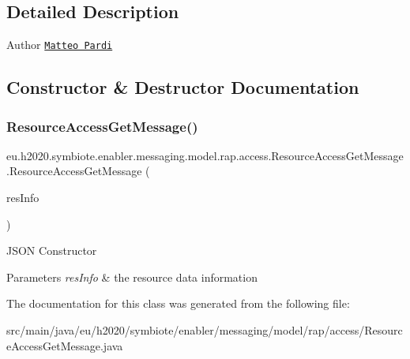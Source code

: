 \subsection{Detailed Description}
\begin{DoxyAuthor}{Author}
\href{mailto:m.pardi@nextworks.it}{\tt Matteo Pardi} 
\end{DoxyAuthor}


\subsection{Constructor \& Destructor Documentation}
\mbox{\label{classeu_1_1h2020_1_1symbiote_1_1enabler_1_1messaging_1_1model_1_1rap_1_1access_1_1ResourceAccessGetMessage_a539d5238081dabe82785d5323e6fb70e}} 
\subsubsection{\texorpdfstring{Resource\+Access\+Get\+Message()}{ResourceAccessGetMessage()}}
{\footnotesize\ttfamily eu.\+h2020.\+symbiote.\+enabler.\+messaging.\+model.\+rap.\+access.\+Resource\+Access\+Get\+Message.\+Resource\+Access\+Get\+Message (\begin{DoxyParamCaption}\item[{@Json\+Property(\char`\"{}resource\+Info\char`\"{}) List$<$ \hyperlink{classeu_1_1h2020_1_1symbiote_1_1enabler_1_1messaging_1_1model_1_1rap_1_1db_1_1ResourceInfo}{Resource\+Info} $>$}]{res\+Info }\end{DoxyParamCaption})}

J\+S\+ON Constructor 
\begin{DoxyParams}{Parameters}
{\em res\+Info} & the resource data information \\
\hline
\end{DoxyParams}


The documentation for this class was generated from the following file\+:\begin{DoxyCompactItemize}
\item 
src/main/java/eu/h2020/symbiote/enabler/messaging/model/rap/access/Resource\+Access\+Get\+Message.\+java\end{DoxyCompactItemize}
